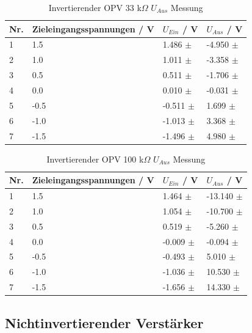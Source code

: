 \documentclass[12pt,a4paper,twoside]{article}
\begin{document}
\begin{table}[H]
    \centering
    \caption{Invertierender OPV 33 k$\Omega$ $U_{Aus}$ Messung}
    \label{tab:IoVerstärkungenGemessen33}
    \begin{tabular}{| l | l | l | l |}
        \hline
        Nr. & Zieleingangsspannungen / V & $U_{Ein}$ / V & $U_{Aus}$ / V \\
        \hline
        1 &  1.5 &  1.486 $\pm$  & -4.950 $\pm$  \\
        2 &  1.0 &  1.011 $\pm$  & -3.358 $\pm$  \\
        3 &  0.5 &  0.511 $\pm$  & -1.706 $\pm$  \\
        4 &  0.0 &  0.010 $\pm$  & -0.031 $\pm$  \\
        5 & -0.5 & -0.511 $\pm$  &  1.699 $\pm$  \\
        6 & -1.0 & -1.013 $\pm$  &  3.368 $\pm$  \\
        7 & -1.5 & -1.496 $\pm$  &  4.980 $\pm$  \\
        \hline
    \end{tabular}
\end{table}

\begin{table}[H]
    \centering
    \caption{Invertierender OPV 100 k$\Omega$ $U_{Aus}$ Messung}
    \label{tab:IoVerstärkungenGemessen100}
    \begin{tabular}{| l | l | l | l |}
        \hline
        Nr. & Zieleingangsspannungen / V & $U_{Ein}$ / V & $U_{Aus}$ / V \\
        \hline
        1 &  1.5 &  1.464 $\pm$  & -13.140 $\pm$  \\
        2 &  1.0 &  1.054 $\pm$  & -10.700 $\pm$  \\
        3 &  0.5 &  0.519 $\pm$  &  -5.260 $\pm$  \\
        4 &  0.0 & -0.009 $\pm$  &  -0.094 $\pm$  \\
        5 & -0.5 & -0.493 $\pm$  &   5.010 $\pm$  \\
        6 & -1.0 & -1.036 $\pm$  &  10.530 $\pm$  \\
        7 & -1.5 & -1.656 $\pm$  &  14.330 $\pm$  \\
        \hline
    \end{tabular}
\end{table}


\subsection{Nichtinvertierender Verstärker}
\end{document}

